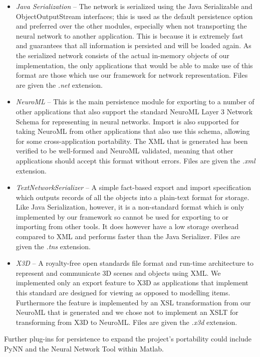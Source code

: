 \documentclass{acm_proc_article-sp}
\begin{document}
{\begin{itemize}
\item { {\textit{Java Serialization\cite{java:ser}}} {--} The network is serialized using the Java Serializable and ObjectOutputStream interfaces; this is used as the default persistence option and preferred over the other modules, especially when not transporting the neural network to another application. This is because it is extremely fast and
guarantees that all information is persisted and will be loaded again. As the serialized network consists of the actual in-memory objects of our implementation, the only applications that would be able to make use of this format are those which use our framework for network representation. Files are given the {\textit{.net}} extension.
}
\item {{\textit{NeuroML\cite{neuroml}}} {--} This is the main persistence module for exporting to a number of other applications that also support the standard
NeuroML Layer 3 Network Schema for representing in neural networks. Import is also supported for taking NeuroML from other applications that also use this schema, allowing for some cross{}-application portability. The XML that is generated has been verified to be well{}-formed and NeuroML validated, meaning that other applications should accept this format without errors. Files are given the {\textit{.xml}} extension.
}
\item {{\textit{TextNetworkSerializer}} {--} A simple fact{}-based export
and import specification which outputs records of all the objects into
a plain-text format for storage. Like Java Serialization, however, it is a non{}-standard format which is only implemented by our framework so cannot be used for exporting to or importing from other tools. It does however have a low storage overhead compared to XML and performs faster than the Java Serializer. Files are given the {\textit{.tns}} extension.
}
\item {{\textit{X3D}} {--} A royalty{}-free open standards file format and run{}-time architecture to represent and communicate 3D scenes and objects using XML\cite{web3d}. We implemented only an export feature to X3D as applications that implement this standard are designed for viewing as opposed to modelling items. Furthermore the feature is implemented by an XSL transformation from our NeuroML that is generated and we chose not to implement an XSLT for transforming from X3D to NeuroML. Files are given the {\textit{.x3d}} extension.
}
\end{itemize}

Further plug{}-ins for persistence to expand the project's portability could include PyNN\cite{pynn} and the Neural Network Tool within Matlab\cite{nntool}.
}
\end{document}
